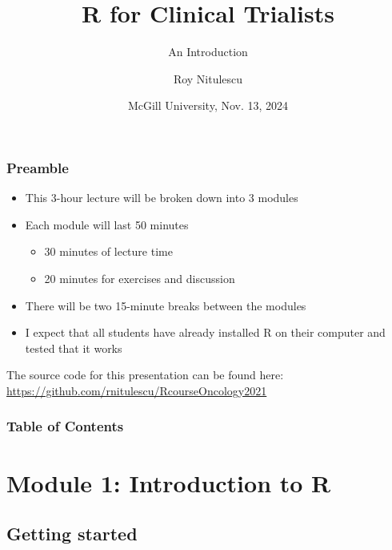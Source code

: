\documentclass{beamer}
\title{R for Clinical Trialists}
\subtitle{An Introduction}
\author{Roy Nitulescu\inst{1}}
\institute
{
    \inst{1}%
    CORE / BCU\\
    RI-MUHC
}
\date[McGill, Nov. 13, 2024]{McGill University, Nov. 13, 2024}
\begin{document}

\frame{\titlepage}


\begin{frame}
    \frametitle{Preamble}
    \begin{itemize}
      \item This 3-hour lecture will be broken down into 3 modules
      \pause
      \item Each module will last 50 minutes
      \pause
      \begin{itemize}
        \item 30 minutes of lecture time
        \pause
        \item 20 minutes for exercises and discussion
        \pause
      \end{itemize}
      \item There will be two 15-minute breaks between the modules
      \pause
      \item I expect that all students have already installed R on their computer and tested that it works
    \end{itemize}
    
    \vfill
    
    \pause

    The source code for this presentation can be found here:\\
    \url{https://github.com/rnitulescu/RcourseOncology2021}
\end{frame}


\begin{frame}
    \frametitle{Table of Contents}
    \tableofcontents
\end{frame}



\section{Module 1: Introduction to R}

\subsection{Getting started}
\end{document}
